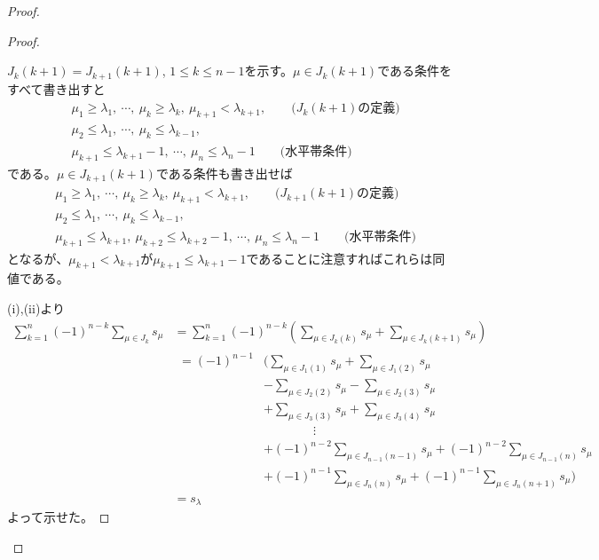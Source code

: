 \documentclass{ltjsreport}
\begin{document}
\begin{proof}
\begin{proof}
\begin{enumerate}
            $J_k(k+1)=J_{k+1}(k+1)$, $1\leq k\leq n-1$を示す。$\mu\in J_k(k+1)$である条件をすべて書き出すと
            \begin{align*}
                &\mu_1\geq \lambda_1,\:\cdots,\:\mu_k\geq\lambda_k,\:\mu_{k+1}<\lambda_{k+1},\qquad\text{($J_k(k+1)$の定義)}\\
                &\mu_2\leq\lambda_1,\:\cdots,\:\mu_k\leq\lambda_{k-1},\\
                &\mu_{k+1}\leq\lambda_{k+1}-1,\:\cdots,\:\mu_{n}\leq\lambda_{n}-1\qquad\text{(水平帯条件)}
            \end{align*}
            である。$\mu\in J_{k+1}(k+1)$である条件も書き出せば
            \begin{align*}
                &\mu_1\geq \lambda_1,\:\cdots,\:\mu_k\geq\lambda_k,\:\mu_{k+1}<\lambda_{k+1},\qquad\text{($J_{k+1}(k+1)$の定義)}\\
                &\mu_2\leq\lambda_1,\:\cdots,\:\mu_k\leq\lambda_{k-1},\\
                &\mu_{k+1}\leq\lambda_{k+1},\:\mu_{k+2}\leq\lambda_{k+2}-1,\:\cdots,\:\mu_{n}\leq\lambda_{n}-1\qquad\text{(水平帯条件)}
            \end{align*}
            となるが、$\mu_{k+1}<\lambda_{k+1}$が$\mu_{k+1}\leq\lambda_{k+1}-1$であることに注意すればこれらは同値である。
        \end{enumerate}

        (i),(ii)より
        \begin{align*}
            \sum_{k=1}^n(-1)^{n-k}\sum_{\mu\in J_k}s_\mu
            &=\sum_{k=1}^n(-1)^{n-k}(\sum_{\mu\in J_{k}(k)}s_\mu+\sum_{\mu\in J_k(k+1)}s_\mu)\\
            &\begin{aligned}
                =(-1)^{n-1}&(\sum_{\mu\in J_1(1)}s_\mu + \sum_{\mu\in J_1(2)}s_\mu \\
                &-\sum_{\mu\in J_2(2)}s_\mu - \sum_{\mu\in J_2(3)}s_\mu \\
                &+\sum_{\mu\in J_3(3)}s_\mu + \sum_{\mu\in J_3(4)}s_\mu \\
                &\qquad\qquad\vdots\\
                &+(-1)^{n-2}\sum_{\mu\in J_{n-1}(n-1)}s_\mu + (-1)^{n-2}\sum_{\mu\in J_{n-1}(n)}s_\mu\\
                &+(-1)^{n-1}\sum_{\mu\in J_n(n)}s_\mu + (-1)^{n-1}\sum_{\mu\in J_n(n+1)}s_\mu)
            \end{aligned}\\
            &=s_\lambda
        \end{align*}
        よって示せた。
    \end{proof}
\end{proof}
\end{document}
